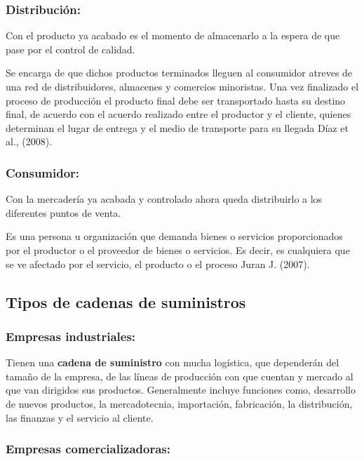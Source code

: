 \documentclass[
  jou,
  floatsintext,
  longtable,
  a4paper,
  nolmodern,
  notxfonts,
  notimes,
  colorlinks=true,linkcolor=blue,citecolor=blue,urlcolor=blue]{apa7}
\begin{document}
\subsubsection{Distribución:}\label{distribuciuxf3n}

Con el producto ya acabado es el momento de almacenarlo a la espera de
que pase por el control de calidad.

Se encarga de que dichos productos terminados lleguen al consumidor
atreves de una red de distribuidores, almacenes y comercios minoristas.
Una vez finalizado el proceso de producción el producto final debe ser
transportado hasta su destino final, de acuerdo con el acuerdo realizado
entre el productor y el cliente, quienes determinan el lugar de entrega
y el medio de transporte para su llegada Díaz et al., (2008).

\subsubsection{Consumidor:}\label{consumidor}

Con la mercadería ya acabada y controlado ahora queda distribuirlo a los
diferentes puntos de venta.

Es una persona u organización que demanda bienes o servicios
proporcionados por el productor o el proveedor de bienes o servicios. Es
decir, es cualquiera que se ve afectado por el servicio, el producto o
el proceso Juran J. (2007).

\subsection{Tipos de cadenas de
suministros}\label{tipos-de-cadenas-de-suministros}

\subsubsection{Empresas industriales:}\label{empresas-industriales}

Tienen una \textbf{cadena de suministro} con mucha logística, que
dependerán del tamaño de la empresa, de las líneas de producción con que
cuentan y mercado al que van dirigidos sus productos. Generalmente
incluye funciones como, desarrollo de nuevos productos, la
mercadotecnia, importación, fabricación, la distribución, las finanzas y
el servicio al cliente.

\subsubsection{Empresas
comercializadoras:}\label{empresas-comercializadoras}
\end{document}
